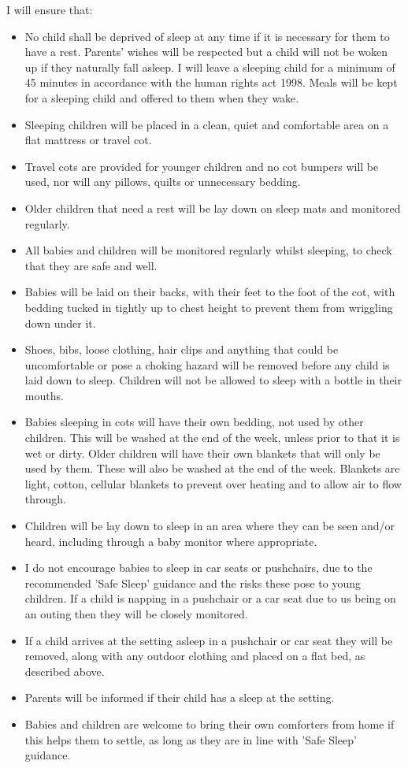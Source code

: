 I will ensure that:
\begin{itemize}
\item No child shall be deprived of sleep at any time if it is necessary for them to have a rest. Parents' wishes will be respected but a child will not be woken up if they naturally fall asleep. I will leave a sleeping child for a minimum of 45 minutes in accordance with the human rights act 1998. Meals will be kept for a sleeping child and offered to them when they wake. 
\item Sleeping children will be placed in a clean, quiet and comfortable area on a flat mattress or travel cot.
\item Travel cots are provided for younger children and no cot bumpers will be used, nor will any pillows, quilts or unnecessary bedding. 
\item Older children that need a rest will be lay down on sleep mats and monitored regularly.
\item All babies and children will be monitored regularly whilst sleeping, to check that they are safe and well. 
\item Babies will be laid on their backs, with their feet to the foot of the cot, with bedding tucked in tightly up to chest height to prevent them from wriggling down under it.
\item Shoes, bibs, loose clothing, hair clips and anything that could be uncomfortable or pose a choking hazard will be removed before any child is laid down to sleep. Children will not be allowed to sleep with a bottle in their mouths.
\item Babies sleeping in cots will have their own bedding, not used by other children. This will be washed at the end of the week, unless prior to that it is wet or dirty. Older children will have their own blankets that will only be used by them. These will also be washed at the end of the week. Blankets are light, cotton, cellular blankets to prevent over heating and to allow air to flow through.
\item Children will be lay down to sleep in an area where they can be seen and/or heard, including through a baby monitor where appropriate.
\item I do not encourage babies to sleep in car seats or pushchairs, due to the recommended 'Safe Sleep' guidance and the  risks these pose to young children. If a child is napping in a pushchair or a car seat due to us being on an outing then they will be closely monitored.
\item If a child arrives at the setting asleep in a pushchair or car seat they will be removed, along with any outdoor clothing and placed on a flat bed, as described above. 
\item Parents will be informed if their child has a sleep at the setting.
\item Babies and children are welcome to bring their own comforters from home if this helps them to settle, as long as they are in line with 'Safe Sleep' guidance.
\end{itemize}

